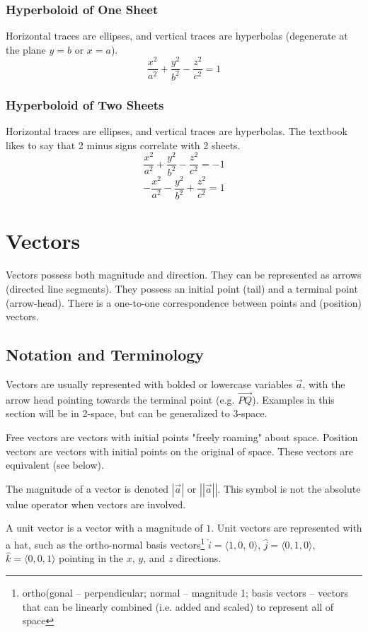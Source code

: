 \documentclass{article}
\begin{document}
\subsubsection{Hyperboloid of One Sheet}
Horizontal traces are ellipses, and vertical traces are hyperbolas (degenerate at the plane $y=b$ or $x=a$).
$$\frac{x^2}{a^2} + \frac{y^2}{b^2} - \frac{z^2}{c^2}=1$$

\subsubsection{Hyperboloid of Two Sheets}
Horizontal traces are ellipses, and vertical traces are hyperbolas. The textbook likes to say that 2 minus signs correlate with 2 sheets.
$$\frac{x^2}{a^2} + \frac{y^2}{b^2} - \frac{z^2}{c^2}= -1$$
$$-\frac{x^2}{a^2} - \frac{y^2}{b^2} + \frac{z^2}{c^2}= 1$$

\section{Vectors}

Vectors possess both magnitude and direction. They can be represented as arrows (directed line segments). They possess an initial point (tail) and a terminal point (arrow-head).
There is a one-to-one correspondence between points and (position) vectors.

\subsection{Notation and Terminology}
Vectors are usually represented with bolded or lowercase variables $\Vec{a}$, with the arrow head pointing towards the terminal point (e.g. $\overrightarrow{PQ}$). Examples in this section will be in 2-space, but can be generalized to 3-space.

Free vectors are vectors with initial points "freely roaming" about space. Position vectors are vectors with initial points on the original of space. These vectors are equivalent (see below).

The magnitude of a vector is denoted $\left|\Vec{a}\right|$ or $\left|\left|\Vec{a}\right|\right|$. This symbol is not the absolute value operator when vectors are involved.

A unit vector is a vector with a magnitude of $1$. Unit vectors are represented with a hat, such as the ortho-normal basis vectors\footnote{ortho(gonal -- perpendicular; normal -- magnitude 1; basis vectors -- vectors that can be linearly combined (i.e. added and scaled) to represent all of space} $\hat{i} = \langle1, 0$, $0\rangle$, $\hat{j} = \langle 0, 1, 0 \rangle$, $\hat{k} = \langle 0, 0, 1 \rangle$ pointing in the $x$, $y$, and $z$ directions.
\end{document}
